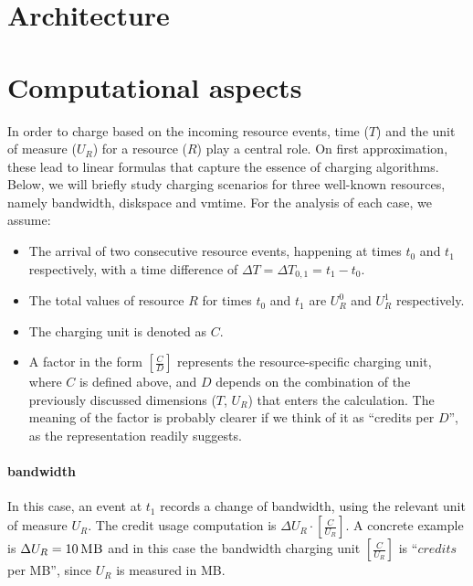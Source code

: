 \documentclass[letterpaper,twocolumn,10pt]{article}
\newcommand{\DTime}{\ensuremath{T}\xspace} %
\newcommand{\DUnitR}{\ensuremath{U_{R}}\xspace} %
\newcommand{\MB}[1]{\ensuremath{#1\,\mbox{\sc MB}}}
\begin{document}
\section{Architecture}


\section{Computational aspects}

In order to charge based on the incoming resource events, time (\DTime) and the unit of measure (\DUnitR) for a resource ($R$) play a central role. On first approximation, these lead to linear formulas that capture the essence of charging algorithms. Below, we will briefly  study charging scenarios for three well-known resources, namely \textsf{bandwidth}, \textsf{diskspace} and \textsf{vmtime}. For the analysis of each case, we assume: 
\begin{itemize}
\item The arrival of two consecutive resource events, happening at times $t_0$ and $t_1$ respectively, with a time difference of  $\Delta T = \Delta T_{0, 1} = t_1 - t_0$.

\item The total values of resource $R$ for times $t_0$ and $t_1$ are $U_R^0$ and $U_R^1$ respectively.

\item The charging unit is denoted as $C$.

\item A factor in the form $[\frac{C}{D}]$ represents the resource-specific charging unit, where $C$ is defined above, and $D$ depends on the combination of the previously discussed dimensions ($T$, $U_R$) that enters the calculation. The meaning of the factor is probably clearer if we think of it as ``credits per $D$'', as the representation readily suggests.
\end{itemize}

\paragraph{\textsf{bandwidth}}
In this case, an event at $t_1$ records a change of bandwidth, using the relevant unit of measure $U_R$.  The credit usage computation is $\Delta U_R \cdot  [ \frac{C}{U_R} ]$.
A concrete example is $\Delta U_R = \MB{10}$ and in this case the bandwidth charging unit $[ \frac{C}{U_R} ]$ is ``$credits$ per {\sc MB}'', since $U_R$ is measured in {\sc MB}.
\end{document}
